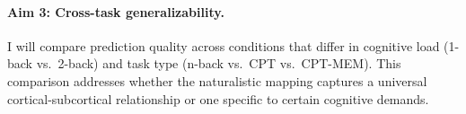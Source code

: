 \paragraph{Aim 3: Cross-task generalizability.} I will compare prediction quality across conditions that differ in cognitive load (1-back vs.\ 2-back) and task type (n-back vs.\ CPT vs.\ CPT-MEM). This comparison addresses whether the naturalistic mapping captures a universal cortical-subcortical relationship or one specific to certain cognitive demands.
